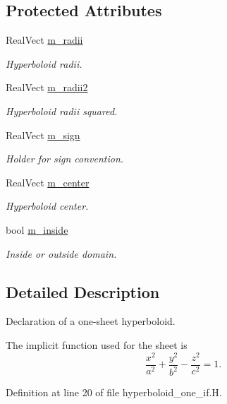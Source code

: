 \subsection*{Protected Attributes}
\begin{DoxyCompactItemize}
\item 
Real\+Vect \hyperlink{classhyperboloid__one__if_a9f55aa33c7af9234af8152a3123a4c11}{m\+\_\+radii}
\begin{DoxyCompactList}\small\item\em Hyperboloid radii. \end{DoxyCompactList}\item 
Real\+Vect \hyperlink{classhyperboloid__one__if_ad46f70b1af15a70c719887a043df653a}{m\+\_\+radii2}
\begin{DoxyCompactList}\small\item\em Hyperboloid radii squared. \end{DoxyCompactList}\item 
Real\+Vect \hyperlink{classhyperboloid__one__if_a72d14f7592fbfbc57258d98b4fe650cf}{m\+\_\+sign}
\begin{DoxyCompactList}\small\item\em Holder for sign convention. \end{DoxyCompactList}\item 
Real\+Vect \hyperlink{classhyperboloid__one__if_a705bda123396b99e5d59a3b52cf3e18a}{m\+\_\+center}
\begin{DoxyCompactList}\small\item\em Hyperboloid center. \end{DoxyCompactList}\item 
bool \hyperlink{classhyperboloid__one__if_ad505218e6b5323e842ce5a5a9b86b4ce}{m\+\_\+inside}
\begin{DoxyCompactList}\small\item\em Inside or outside domain. \end{DoxyCompactList}\end{DoxyCompactItemize}


\subsection{Detailed Description}
Declaration of a one-\/sheet hyperboloid. 

The implicit function used for the sheet is \[ \frac{x^2}{a^2} + \frac{y^2}{b^2} - \frac{z^2}{c^2} = 1. \] 

Definition at line 20 of file hyperboloid\+\_\+one\+\_\+if.\+H.



